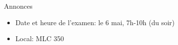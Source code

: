 \begin{frame}{Annonces}
  \begin{itemize}
    \item Date et heure de l'examen: le 6 mai, 7h-10h (du soir)
    \item Local: MLC 350
  \end{itemize}
\end{frame}